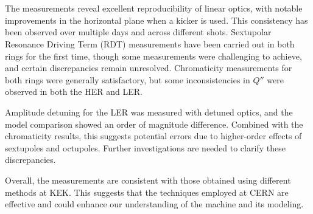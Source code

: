 \FloatBarrier
\section{}

The measurements reveal excellent reproducibility of linear optics, with notable improvements in the
horizontal plane when a kicker is used. This consistency has been observed over multiple days and
across different shots. Sextupolar Resonance Driving Term (RDT) measurements have been carried out
in both rings for the first time, though some measurements were challenging to achieve, and certain
discrepancies remain unresolved. Chromaticity measurements for both rings were generally
satisfactory, but some inconsistencies in $Q''$ were observed in both the HER and LER.

Amplitude detuning for the LER was measured with detuned optics, and the model comparison showed an
order of magnitude difference. Combined with the chromaticity results, this suggests potential
errors due to higher-order effects of sextupoles and octupoles. Further investigations are needed to
clarify these discrepancies.

Overall, the measurements are consistent with those obtained using different methods at KEK. This
suggests that the techniques employed at CERN are effective and could enhance our understanding of
the machine and its modeling.